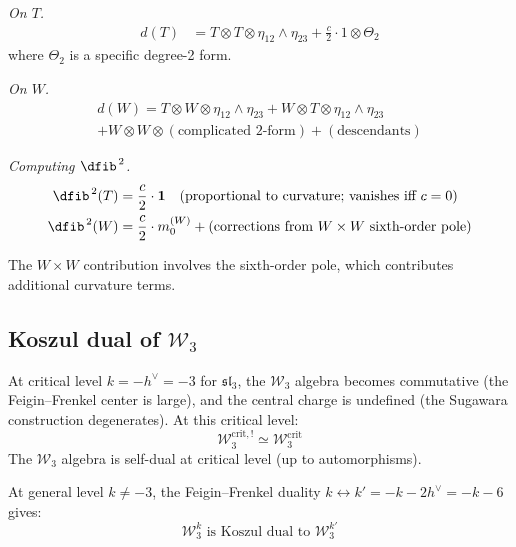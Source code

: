 \begin{computation}
\emph{On $T$.}
\begin{align}
d(T) &= T \otimes T \otimes \eta_{12} \wedge \eta_{23} + \frac{c}{2} \cdot 1 \otimes \Theta_2
\end{align}
where $\Theta_2$ is a specific degree-2 form.

\emph{On $W$.}
\begin{multline}
d(W) = T \otimes W \otimes \eta_{12} \wedge \eta_{23} + W \otimes T \otimes \eta_{12} \wedge \eta_{23} \\
+ W \otimes W \otimes (\text{complicated 2-form}) + (\text{descendants})
\end{multline}

\emph{Computing $\dfib^{\,2}$.}
\begin{align}
\dfib^{\,2}(T) &= \frac{c}{2} \cdot \mathbf{1} \quad \text{(proportional to curvature; vanishes iff $c = 0$)} \\
\dfib^{\,2}(W) &= \frac{c}{2} \cdot m_0^{(W)} + (\text{corrections from } W \times W \text{ sixth-order pole})
\end{align}

The $W \times W$ contribution involves the sixth-order pole, which contributes additional curvature terms.
\end{computation}

\subsection{\texorpdfstring{Koszul dual of $\mathcal{W}_3$}{Koszul dual of W 3}}

\begin{theorem}\label{thm:w3-koszul-dual}
At critical level $k = -h^\vee = -3$ for $\mathfrak{sl}_3$, the $\mathcal{W}_3$ algebra becomes commutative (the Feigin--Frenkel center is large), and the central charge is undefined (the Sugawara construction degenerates). At this critical level:
\begin{equation}
\mathcal{W}_3^{\text{crit},!} \simeq \mathcal{W}_3^{\text{crit}}
\end{equation}
The $\mathcal{W}_3$ algebra is self-dual at critical level (up to automorphisms).

At general level $k \neq -3$, the Feigin--Frenkel duality $k \leftrightarrow k' = -k - 2h^\vee = -k-6$ gives:
\begin{equation}
\mathcal{W}_3^{k} \text{ is Koszul dual to } \mathcal{W}_3^{k'}
\end{equation}
\end{theorem}

